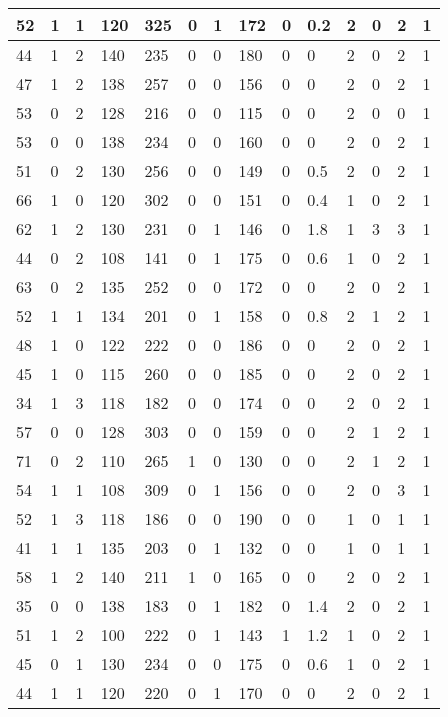 \documentclass{article}
\begin{document}
\begin{table}[h!]
\begin{tabular}{|l|l|l|l|l|l|l|l|l|l|l|l|l|l|}
52 & 1 & 1 & 120 & 325 & 0 & 1 & 172 & 0 & 0.2 & 2  &0 & 2 & 1 \\ \hline
44 & 1 & 2 & 140 & 235 & 0 & 0 & 180 & 0 & 0 & 2  &0 & 2 & 1 \\ \hline
47 & 1 & 2 & 138 & 257 & 0 & 0 & 156 & 0 & 0 & 2  &0 & 2 & 1 \\ \hline
53 & 0 & 2 & 128 & 216 & 0 & 0 & 115 & 0 & 0 & 2  &0 & 0 & 1 \\ \hline
53 & 0 & 0 & 138 & 234 & 0 & 0 & 160 & 0 & 0 & 2  &0 & 2 & 1 \\ \hline
51 & 0 & 2 & 130 & 256 & 0 & 0 & 149 & 0 & 0.5 & 2  &0 & 2 & 1 \\ \hline
66 & 1 & 0 & 120 & 302 & 0 & 0 & 151 & 0 & 0.4 & 1  &0 & 2 & 1 \\ \hline
62 & 1 & 2 & 130 & 231 & 0 & 1 & 146 & 0 & 1.8 & 1  &3 & 3 & 1 \\ \hline
44 & 0 & 2 & 108 & 141 & 0 & 1 & 175 & 0 & 0.6 & 1  &0 & 2 & 1 \\ \hline
63 & 0 & 2 & 135 & 252 & 0 & 0 & 172 & 0 & 0 & 2  &0 & 2 & 1 \\ \hline
52 & 1 & 1 & 134 & 201 & 0 & 1 & 158 & 0 & 0.8 & 2  &1 & 2 & 1 \\ \hline
48 & 1 & 0 & 122 & 222 & 0 & 0 & 186 & 0 & 0 & 2  &0 & 2 & 1 \\ \hline
45 & 1 & 0 & 115 & 260 & 0 & 0 & 185 & 0 & 0 & 2  &0 & 2 & 1 \\ \hline
34 & 1 & 3 & 118 & 182 & 0 & 0 & 174 & 0 & 0 & 2  &0 & 2 & 1 \\ \hline
57 & 0 & 0 & 128 & 303 & 0 & 0 & 159 & 0 & 0 & 2  &1 & 2 & 1 \\ \hline
71 & 0 & 2 & 110 & 265 & 1 & 0 & 130 & 0 & 0 & 2  &1 & 2 & 1 \\ \hline
54 & 1 & 1 & 108 & 309 & 0 & 1 & 156 & 0 & 0 & 2  &0 & 3 & 1 \\ \hline
52 & 1 & 3 & 118 & 186 & 0 & 0 & 190 & 0 & 0 & 1  &0 & 1 & 1 \\ \hline
41 & 1 & 1 & 135 & 203 & 0 & 1 & 132 & 0 & 0 & 1  &0 & 1 & 1 \\ \hline
58 & 1 & 2 & 140 & 211 & 1 & 0 & 165 & 0 & 0 & 2  &0 & 2 & 1 \\ \hline
35 & 0 & 0 & 138 & 183 & 0 & 1 & 182 & 0 & 1.4 & 2  &0 & 2 & 1 \\ \hline
51 & 1 & 2 & 100 & 222 & 0 & 1 & 143 & 1 & 1.2 & 1  &0 & 2 & 1 \\ \hline
45 & 0 & 1 & 130 & 234 & 0 & 0 & 175 & 0 & 0.6 & 1  &0 & 2 & 1 \\ \hline
44 & 1 & 1 & 120 & 220 & 0 & 1 & 170 & 0 & 0 & 2  &0 & 2 & 1 \\ \hline

\end{tabular}
\end{table}
\end{document}
